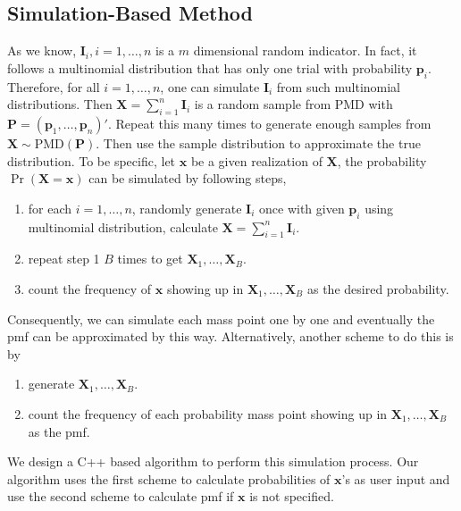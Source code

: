 \documentclass[12pt]{article}
\newcommand{\Ivec}{{\boldsymbol{I}}}
\newcommand{\Pmat}{\mathbf{P}}
\newcommand{\pvec}{\boldsymbol{p}}
\newcommand{\PMD}{\textrm{PMD}}
\newcommand{\Xvec}{\boldsymbol{X}}
\newcommand{\xvec}{\boldsymbol{x}}
\begin{document}
\subsection{Simulation-Based Method}
As we know, $\Ivec_i, i=1,\dots,n$ is a $m$ dimensional random indicator. In fact, it follows a multinomial distribution that has only one trial with probability $\pvec_i$. Therefore, for all $i=1,\dots, n$, one can simulate $\Ivec_i$ from such multinomial distributions. Then $\Xvec = \sum_{i=1}^{n}\Ivec_i$ is a random sample from $\PMD$ with $\Pmat = (\pvec_1, \dots,\pvec_n)'$. Repeat this many times to generate enough samples from $\Xvec \sim \PMD(\Pmat)$. Then use the sample distribution to approximate the true distribution. To be specific, let $\xvec$ be a given realization of $\Xvec$, the probability $\Pr(\Xvec=\xvec)$ can be simulated by following steps,
\begin{enumerate}[Step 1]
    \item for each $i=1,\dots,n$,  randomly generate $\Ivec_i$ once with given $\pvec_i$ using multinomial distribution, calculate $\Xvec = \sum_{i=1}^{n}\Ivec_i$.
    \item repeat step 1 $B$ times to get $\Xvec_{1},\dots,\Xvec_{B}.$
    \item count the frequency of $\xvec$ showing up in $\Xvec_{1},\dots,\Xvec_{B}$ as the desired probability.
\end{enumerate}
Consequently, we can simulate each mass point one by one and eventually the pmf can be approximated by this way. Alternatively, another scheme to do this is by
\begin{enumerate}[Step 1]
	\item generate $\Xvec_{1},\dots,\Xvec_{B}$.
	\item count the frequency of each probability mass point showing up in $\Xvec_{1},\dots,\Xvec_{B}$ as the pmf.
\end{enumerate}

We design a C++ based algorithm to perform this simulation process. Our algorithm uses the first scheme to calculate probabilities of $\xvec$'s as user input  and use the second scheme to calculate pmf if $\xvec$ is not specified.
\end{document}

